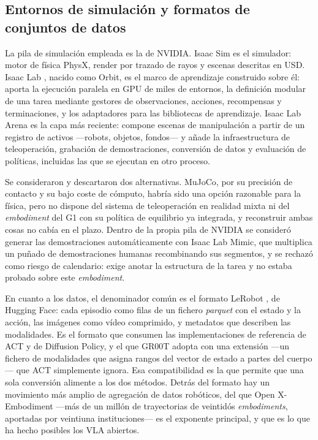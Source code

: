 \subsection{Entornos de simulación y formatos de conjuntos de datos}

La pila de simulación empleada es la de NVIDIA. Isaac Sim \cite{isaacsim} es el simulador: motor de
física PhysX, render por trazado de rayos y escenas descritas en USD. Isaac Lab
\cite{mittal2023orbit}, nacido como Orbit, es el marco de aprendizaje construido sobre él: aporta la
ejecución paralela en GPU de miles de entornos, la definición modular de una tarea mediante gestores
de observaciones, acciones, recompensas y terminaciones, y los adaptadores para las bibliotecas de
aprendizaje. Isaac Lab Arena \cite{isaaclab_arena} es la capa más reciente: compone escenas de
manipulación a partir de un registro de activos —robots, objetos, fondos— y añade la infraestructura
de teleoperación, grabación de demostraciones, conversión de datos y evaluación de políticas,
incluidas las que se ejecutan en otro proceso.

Se consideraron y descartaron dos alternativas. MuJoCo, por su precisión de contacto y su bajo coste
de cómputo, habría sido una opción razonable para la física, pero no dispone del sistema de
teleoperación en realidad mixta ni del \textit{embodiment} del G1 con su política de equilibrio ya
integrada, y reconstruir ambas cosas no cabía en el plazo. Dentro de la propia pila de NVIDIA se
consideró generar las demostraciones automáticamente con Isaac Lab Mimic, que multiplica un puñado
de demostraciones humanas recombinando sus segmentos, y se rechazó como riesgo de calendario: exige
anotar la estructura de la tarea y no estaba probado sobre este \textit{embodiment}.

En cuanto a los datos, el denominador común es el formato LeRobot \cite{cadene2024lerobot}, de
Hugging Face: cada episodio como filas de un fichero \textit{parquet} con el estado y la acción, las
imágenes como vídeo comprimido, y metadatos que describen las modalidades. Es el formato que
consumen las implementaciones de referencia de ACT y de Diffusion Policy, y el que GR00T adopta con
una extensión —un fichero de modalidades que asigna rangos del vector de estado a partes del
cuerpo— que ACT simplemente ignora. Esa compatibilidad es la que permite que una sola conversión
alimente a los dos métodos. Detrás del formato hay un movimiento más amplio de agregación de datos
robóticos, del que Open X-Embodiment \cite{oxe2023} —más de un millón de trayectorias de veintidós
\textit{embodiments}, aportadas por veintiuna instituciones— es el exponente principal, y que es lo
que ha hecho posibles los VLA abiertos.

